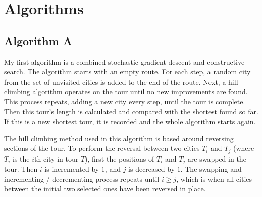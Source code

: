 \documentclass[a4paper,11pt]{article}
\begin{document}
\section{Algorithms}
\subsection{Algorithm A}
My first algorithm is a combined stochastic gradient descent and constructive
search. The algorithm starts with an empty route. For each step, a random city
from the set of unvisited cities is added to the end of the route. Next, a
hill climbing algorithm operates on the tour until no new improvements are
found. This process repeats, adding a new city every step, until the tour is
complete. Then this tour's length is calculated and compared with the shortest
found so far. If this is a new shortest tour, it is recorded and the whole
algorithm starts again.

The hill climbing method used in this algorithm is based around reversing
sections of the tour. To perform the reversal between two cities $T_i$ and
$T_j$ (where $T_i$ is the $i$th city in tour $T$), first the positions of $T_i$
and $T_j$ are swapped in the tour. Then $i$ is incremented by $1$, and $j$ is
decreased by $1$. The swapping and incrementing / decrementing process repeats
until $i \ge j$, which is when all cities between the initial two selected ones
have been reversed in place.
\end{document}
